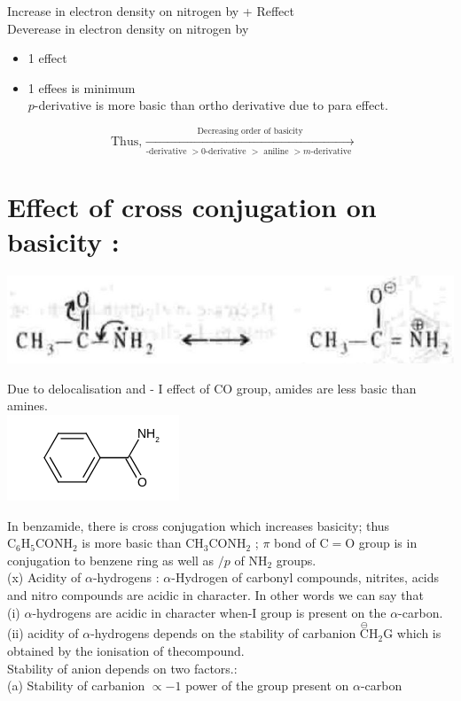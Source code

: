 \documentclass[10pt]{article}
\begin{document}
Increase in electron density on nitrogen by + Reffect\\
Deverease in electron density on nitrogen by

\begin{itemize}
  \item 1 effect
  \item 1 effees is minimum\\
$p$-derivative is more basic than ortho derivative due to para effect.
\end{itemize}

$$
\text { Thus, } \xrightarrow[\text {-derivative }>0 \text {-derivative }>\text { aniline }>m \text {-derivative }]{\text { Decreasing order of basicity }}
$$

\section*{Effect of cross conjugation on basicity :}
\begin{center}
\includegraphics[max width=\textwidth]{2025_01_28_8470952b98110cec3aabg-080(1)}
\end{center}

Due to delocalisation and - I effect of CO group, amides are less basic than amines.\\
\includegraphics{smile-daf689728c306f28541ce9f4fd2d77f7b0fb0cf7}

In benzamide, there is cross conjugation which increases basicity; thus $\mathrm{C}_{6} \mathrm{H}_{5} \mathrm{CONH}_{2}$ is more basic than $\mathrm{CH}_{3} \mathrm{CONH}_{2}$ ; $\pi$ bond of $\mathrm{C}=\mathrm{O}$ group is in conjugation to benzene ring as well as $/ p$ of $\mathrm{NH}_{2}$ groups.\\
(x) Acidity of $\alpha$-hydrogens : $\alpha$-Hydrogen of carbonyl compounds, nitrites, acids and nitro compounds are acidic in character. In other words we can say that\\
(i) $\alpha$-hydrogens are acidic in character when-I group is present on the $\alpha$-carbon.\\
(ii) acidity of $\alpha$-hydrogens depends on the stability of carbanion $\stackrel{\ominus}{\mathrm{C}} \mathrm{H}_{2} \mathrm{G}$ which is obtained by the ionisation of thecompound.\\
Stability of anion depends on two factors.:\\
(a) Stability of carbanion $\propto-1$ power of the group present on $\alpha$-carbon
\end{document}
